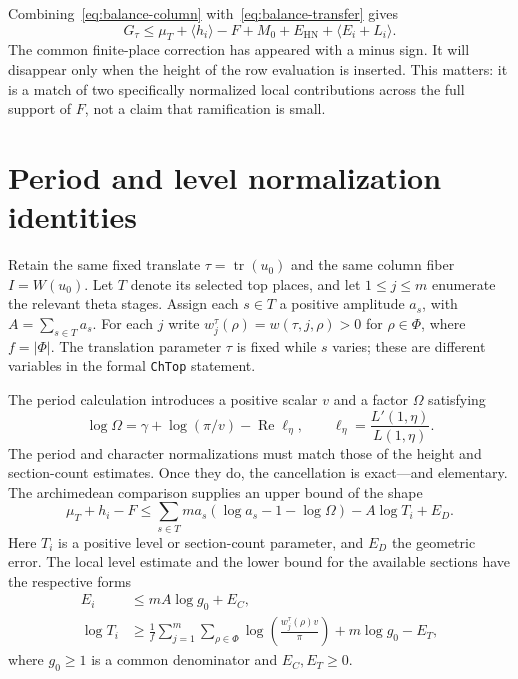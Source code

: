 \documentclass[11pt,openany,oneside]{scrbook}
\theoremstyle{definition}
\theoremstyle{remark}
\newcommand{\Rea}{\operatorname{Re}}
\begin{document}
Combining~\eqref{eq:balance-column} with~\eqref{eq:balance-transfer} gives
\begin{equation}\label{eq:balance-first-rearrange}
G_\tau\le\mu_T+\langle h_i\rangle-F
+M_0+E_{\mathrm{HN}}+\langle E_i+L_i\rangle.
\end{equation}
The common finite-place correction has appeared with a minus sign.  It will disappear only when the height of the row evaluation is inserted.  This matters: it is a match of two specifically normalized local contributions across the full support of $F$, not a claim that ramification is small.

\section{Period and level normalization identities}\label{sec:balance-period}

Retain the same fixed translate $\tau=\operatorname{tr}(u_0)$ and the same column fiber $I=W(u_0)$. Let $T$ denote its selected top places, and let $1\le j\le m$ enumerate the relevant theta stages. Assign each $s\in T$ a positive amplitude $a_s$, with $A=\sum_{s\in T}a_s$. For each $j$ write $w_j^\tau(\rho)=w(\tau,j,\rho)>0$ for $\rho\in\Phi$, where $f=|\Phi|$. The translation parameter $\tau$ is fixed while $s$ varies; these are different variables in the formal \texttt{ChTop} statement.

The period calculation introduces a positive scalar $v$ and a factor $\Omega$ satisfying
\begin{equation}\label{eq:Omega-period}
\log\Omega=\gamma+\log(\pi/v)-\Rea\ell_\eta,
\qquad \ell_\eta=\frac{L'(1,\eta)}{L(1,\eta)}.
\end{equation}
The period and character normalizations must match those of the height and section-count estimates. Once they do, the cancellation is exact—and elementary.  The archimedean comparison supplies an upper bound of the shape
\begin{equation}\label{eq:balance-height}
\mu_T+h_i-F\le
\sum_{s\in T}m a_s(\log a_s-1-\log\Omega)
-A\log T_i+E_D.
\end{equation}
Here $T_i$ is a positive level or section-count parameter, and $E_D$ the geometric error.  The local level estimate and the lower bound for the available sections have the respective forms
\begin{align}\label{eq:balance-level}
E_i&\le mA\log g_0+E_C,\\
\log T_i&\ge\frac1f\sum_{j=1}^m\sum_{\rho\in\Phi}
\log\left(\frac{w_j^\tau(\rho)v}{\pi}\right)+m\log g_0-E_T,
\end{align}
where $g_0\ge1$ is a common denominator and $E_C,E_T\ge0$.
\end{document}
